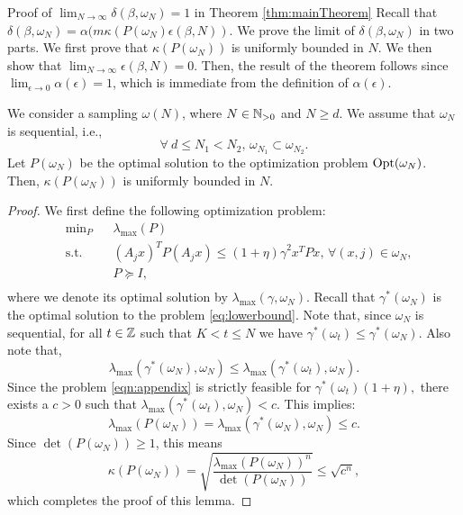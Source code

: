 \begin{subsection}{Proof of  $\lim_{N \to \infty}\delta(\beta, \omega_N) = 1$ in Theorem \ref{thm:mainTheorem}} \label{app:delta}
Recall that $\delta(\beta, \omega_N) = \alpha(m\kappa(P(\omega_N) \epsilon(\beta,N)).$
We prove the limit of $\delta(\beta, \omega_N)$ in two parts. We first prove that $\kappa(P(\omega_N))$ is uniformly bounded in $N$. We then show that $\lim_{N \to \infty} \epsilon(\beta,N) = 0$. Then, the result of the theorem follows since $\lim_{\epsilon \to 0}\alpha(\epsilon) = 1$, which is immediate from the definition of $\alpha(\epsilon)$.

\begin{lemma}\label{lem:bounded} We consider a sampling $\omega(N)$, where $N \in \mathbb{N}_{>0}$ and $N \geq d$. We assume that $\omega_N$ is sequential, i.e., $$\forall\ d \leq N_1  < N_2,\, \omega_{N_1} \subset \omega_{N_2}.$$ Let $P(\omega_N)$ be the optimal solution to the optimization problem $\text{Opt}(\omega_N)$. Then, $\kappa(P(\omega_N))$ is uniformly bounded in $N$.
\end{lemma}

\begin{proof}We first define the following optimization problem:
\begin{equation}\label{eqn:appendix}
\begin{aligned}
& \text{min}_{P} & & \lambda_{\max}(P) \\
& \text{s.t.} 
&  & (A_j x)^TP(A_j x) \leq {(1 +\eta)\gamma}^2 x^TPx,\,\forall (x, j) \in \omega_N, \\
& && P \succeq I, \\
\end{aligned}
\end{equation}
where we denote its optimal solution by $\lambda_{\max}(\gamma , \omega_N)$.
Recall that $\gamma^*(\omega_N)$ is the optimal solution to the problem \eqref{eq:lowerbound}. Note that, since $\omega_N$ is sequential, for all $t \in \mathbb{Z}$ such that \mbox{$K < t \leq N$} we have \mbox{$\gamma^*(\omega_t) \leq \gamma^*(\omega_N)$.} Also note that,
\begin{equation*}\lambda_{\max}(\gamma^*(\omega_N), \omega_N) \leq \lambda_{\max}(\gamma^*(\omega_t), \omega_N).
\end{equation*}
Since the problem \eqref{eqn:appendix} is strictly feasible for $\gamma^*(\omega_t)(1 + \eta),$ there exists a $c > 0$ such that \mbox{$\lambda_{\max}(\gamma^*(\omega_t), \omega_N) <  c$.} This implies: $$\lambda_{\max}(P({\omega_N})) = \lambda_{\max}(\gamma^*(\omega_N), \omega_N) \leq c.$$ Since $\det(P(\omega_N)) \geq 1$, this means $$\kappa(P(\omega_N)) = \sqrt{\frac{\lambda_{\max}(P(\omega_N))^n}{\det(P(\omega_N))}} \leq \sqrt{c^n},$$ which completes the proof of this lemma.
\end{proof}


\end{subsection}
